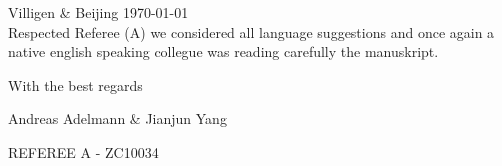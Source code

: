 \documentclass{article}
\begin{document}
Villigen \& Beijing \today \\

Respected Referee (A)
we considered all language suggestions and once again a native english speaking
collegue was reading carefully the manuskript. 

With the best regards

Andreas Adelmann \& Jianjun Yang
  
\pagebreak  

 REFEREE A - ZC10034 \\


 
 
\end{document}
